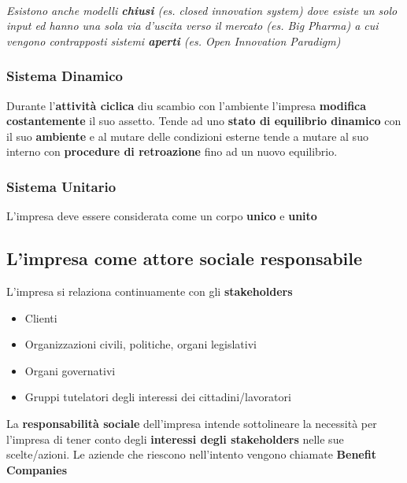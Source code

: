 \documentclass[12pt]{article}
\begin{document}
\paragraph{}\textit{Esistono anche modelli \textbf{chiusi} (es. closed innovation system) dove esiste un solo input ed hanno una sola via d'uscita verso il mercato (es. Big Pharma) a cui vengono contrapposti sistemi \textbf{aperti} (es. Open Innovation Paradigm)}

\subsubsection{Sistema Dinamico}
Durante l'\textbf{attività ciclica} diu scambio con l'ambiente l'impresa \textbf{modifica costantemente} il suo assetto. Tende ad uno \textbf{stato di equilibrio dinamico} con il suo \textbf{ambiente} e al mutare delle condizioni esterne tende a mutare al suo interno con \textbf{procedure di retroazione} fino ad un nuovo equilibrio.

\subsubsection{Sistema Unitario}
L'impresa deve essere considerata come un corpo \textbf{unico} e \textbf{unito}

\subsection{L'impresa come attore sociale responsabile}
L'impresa si relaziona continuamente con gli \textbf{stakeholders}
\begin{itemize}
    \item Clienti
    \item Organizzazioni civili, politiche, organi legislativi
    \item Organi governativi
    \item Gruppi tutelatori degli interessi dei cittadini/lavoratori
\end{itemize}
La \textbf{responsabilità sociale} dell'impresa intende sottolineare la necessità per l'impresa di tener conto degli \textbf{interessi degli stakeholders} nelle sue scelte/azioni. Le aziende che riescono nell'intento vengono chiamate \textbf{Benefit Companies}
\end{document}
